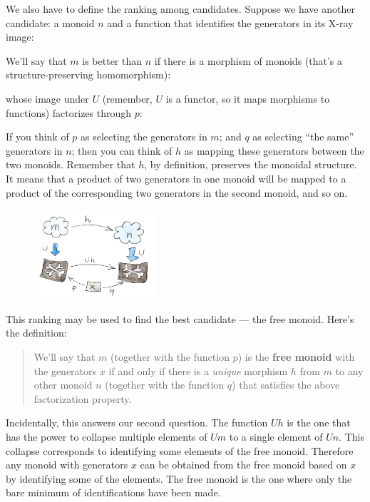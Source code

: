 \noindent
We also have to define the ranking among candidates. Suppose we have
another candidate: a monoid $n$ and a function that identifies
the generators in its X-ray image:

We'll say that $m$ is better than $n$ if there is a
morphism of monoids (that's a structure-preserving homomorphism):

whose image under $U$ (remember, $U$ is a functor, so it
maps morphisms to functions) factorizes through $p$:

If you think of $p$ as selecting the generators in $m$;
and $q$ as selecting ``the same'' generators in $n$; then
you can think of $h$ as mapping these generators between the two
monoids. Remember that $h$, by definition, preserves the monoidal
structure. It means that a product of two generators in one monoid will
be mapped to a product of the corresponding two generators in the second
monoid, and so on.

\begin{figure}[H]
  \centering
  \includegraphics[width=0.4\textwidth]{images/monoid-ranking.jpg}
\end{figure}

\noindent
This ranking may be used to find the best candidate --- the free monoid.
Here's the definition:

\begin{quote}
  We'll say that $m$ (together with the function $p$) is the
  \textbf{free monoid} with the generators $x$ if and only if there
  is a \emph{unique} morphism $h$ from $m$ to any other
  monoid $n$ (together with the function $q$) that satisfies
  the above factorization property.
\end{quote}
Incidentally, this answers our second question. The function
$U h$ is the one that has the power to collapse multiple
elements of $U m$ to a single element of $U n$. This
collapse corresponds to identifying some elements of the free monoid.
Therefore any monoid with generators $x$ can be obtained from the
free monoid based on $x$ by identifying some of the elements. The
free monoid is the one where only the bare minimum of identifications
have been made.

